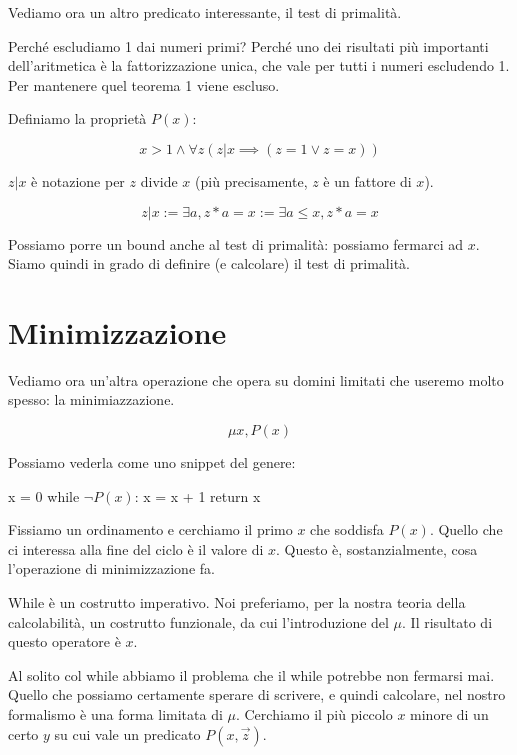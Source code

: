 Vediamo ora un altro predicato interessante, il test di primalità.

Perché escludiamo 1 dai numeri primi? Perché uno dei risultati più importanti dell'aritmetica è
la fattorizzazione unica, che vale per tutti i numeri escludendo 1. Per mantenere quel teorema 1
viene escluso.

Definiamo la proprietà $P(x)$:

\begin{equation*}
    x > 1 \land \forall z (z | x \implies (z = 1 \lor z = x))
\end{equation*}

$z | x$ è notazione per $z$ divide $x$ (più precisamente, $z$ è un fattore di $x$).

\begin{equation*}
    z | x := \exists a, z * a = x := \exists a \leq x, z * a = x
\end{equation*}

Possiamo porre un bound anche al test di primalità: possiamo fermarci ad $x$. Siamo quindi in grado di
definire (e calcolare) il test di primalità.

\section{Minimizzazione}

Vediamo ora un'altra operazione che opera su domini limitati che useremo molto spesso: la
minimiazzazione.

\begin{equation*}
    \mu x, P(x)
\end{equation*}

Possiamo vederla come uno snippet del genere:

\begin{python}
x = 0
while $\lnot P(x)$:
    x = x + 1
return x
\end{python}

Fissiamo un ordinamento e cerchiamo il primo $x$ che soddisfa $P(x)$. Quello che ci interessa alla fine
del ciclo è il valore di $x$. Questo è, sostanzialmente, cosa l'operazione di minimizzazione fa.

While è un costrutto imperativo. Noi preferiamo, per la nostra teoria della calcolabilità, un
costrutto funzionale, da cui l'introduzione del $\mu$. Il risultato di questo operatore è $x$.

Al solito col while abbiamo il problema che il while potrebbe non fermarsi mai. Quello che possiamo
certamente sperare di scrivere, e quindi calcolare, nel nostro formalismo è una forma limitata di
$\mu$. Cerchiamo il più piccolo $x$ minore di un certo $y$ su cui vale un predicato $P(x,\vec{z})$.

